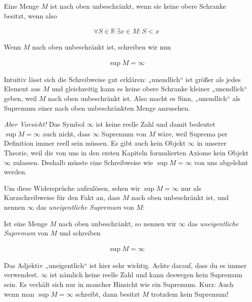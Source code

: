 \documentclass[fontsize=9pt,
               parskip=half-,
               DIV=14,
               listof=chapterentry,
               tocflat]{scrbook}
\begin{document}
\begin{definition*}
Eine Menge $M$ ist nach oben unbeschränkt, wenn sie keine obere Schranke besitzt, wenn also

\begin{align*}
\forall S\in \mathbb {R} \,\exists x\in M:S<x
\end{align*}

\end{definition*}

Wenn $M$ nach oben unbeschränkt ist, schreiben wir nun

\begin{align*}
\sup M=\infty 
\end{align*}

Intuitiv lässt sich die Schreibweise gut erklären: „unendlich“ ist größer als jedes Element aus $M$ und gleichzeitig kann es keine obere Schranke kleiner „unendlich“ geben, weil $M$ nach oben unbeschränkt ist. Also macht es Sinn, „unendlich“ als Supremum einer nach oben unbeschränkten Menge anzusehen.

\emph{Aber Vorsicht!} Das Symbol $\infty $ ist keine reelle Zahl und damit bedeutet $\sup M=\infty $ auch nicht, dass $\infty $ Supremum von $M$ wäre, weil Suprema per Definition immer reell sein müssen. Es gibt auch kein Objekt $\infty $ in unserer Theorie, weil die von uns in den ersten Kapiteln formulierten Axiome kein Objekt $\infty $ zulassen. Deshalb müsste eine Schreibweise wie $\sup M=\infty $ von uns abgelehnt werden.

Um diese Widersprüche aufzulösen, sehen wir $\sup M=\infty $ nur als Kurzschreibweise für den Fakt an, dass $M$ nach oben unbeschränkt ist, und nennen $\infty $ das \emph{uneigentliche Supremum} von $M$:

\begin{definition*}
Ist eine Menge $M$ nach oben unbeschränkt, so nennen wir $\infty $ das \emph{uneigentliche Supremum} von $M$ und schreiben

\begin{align*}
\sup M=\infty 
\end{align*}

\end{definition*}

\begin{warning*}
Das Adjektiv „uneigentlich“ ist hier sehr wichtig. Achte darauf, dass du es immer verwendest. $\infty $ ist nämlich keine reelle Zahl und kann deswegen kein Supremum sein. Es verhält sich nur in mancher Hinsicht wie ein Supremum. Kurz: Auch wenn man $\sup M=\infty $ schreibt, dann besitzt $M$ trotzdem kein Supremum!

\end{warning*}
\end{document}
